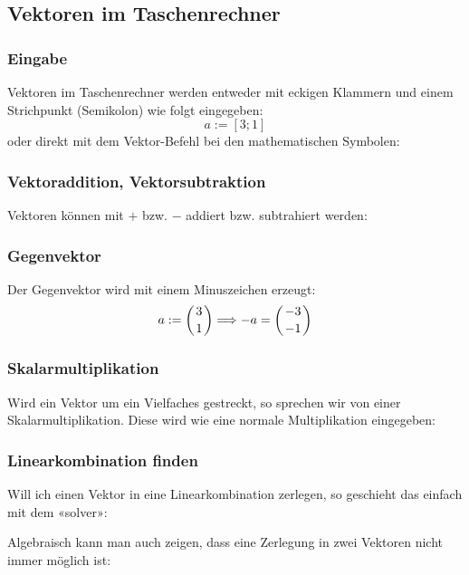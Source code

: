 \subsection{Vektoren im Taschenrechner}

\subsubsection{Eingabe}
Vektoren im Taschenrechner werden entweder mit eckigen Klammern und
einem Strichpunkt (Semikolon) wie folgt eingegeben:
$$a := [3; 1]$$
oder direkt mit dem Vektor-Befehl bei den mathematischen Symbolen:


\subsubsection{Vektoraddition, Vektorsubtraktion}
Vektoren können mit $+$ bzw. $-$ addiert bzw. subtrahiert
werden:

\subsubsection{Gegenvektor}
Der Gegenvektor wird mit einem Minuszeichen erzeugt:
$$a:=\left(3\atop 1\right) \Longrightarrow -a = \left( -3 \atop
-1\right)$$
\newpage

\subsubsection{Skalarmultiplikation}
Wird ein Vektor um ein Vielfaches gestreckt, so sprechen wir von einer
Skalarmultiplikation. Diese wird wie eine normale Multiplikation
eingegeben:


\subsubsection{Linearkombination finden}
Will ich einen Vektor in eine Linearkombination
 zerlegen, so geschieht das einfach mit dem
«solver»:
\newpage


Algebraisch kann man auch zeigen, dass eine Zerlegung in zwei Vektoren
nicht immer möglich ist:

\newpage
